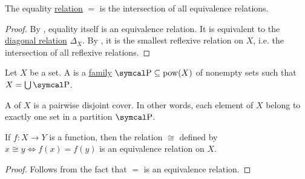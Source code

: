 \begin{proposition}\label{thm:equality_is_smallest_equivalence_relation}
  The equality \hyperref[def:relation]{relation} \( = \) is the intersection of all equivalence relations.
\end{proposition}
\begin{proof}
  By , equality itself is an equivalence relation. It is equivalent to the \hyperref[def:binary_relation/diagonal]{diagonal relation} \( \Delta_X \). By , it is the smallest reflexive relation on \( X \), i.e. the intersection of all reflexive relations.
\end{proof}

\begin{definition}\label{def:set_partition}
  Let \( X \) be a set. A  is a \hyperref[remark:family_of_sets]{family} \( \CP \subseteq \Pow(X) \) of nonempty sets such that \( X = \bigcup \CP \).

  A  of \( X \) is a pairwise disjoint cover. In other words, each element of \( X \) belong to exactly one set in a partition \( \CP \).
\end{definition}

\begin{lemma}\label{thm:equivalence_relation_inheriance}
  If \( f: X \to Y \) is a function, then the relation \( \cong \) defined by \( x \cong y \iff f(x) = f(y) \) is an equivalence relation on \( X \).
\end{lemma}
\begin{proof}
  Follows from the fact that \( = \) is an equivalence relation.
\end{proof}

